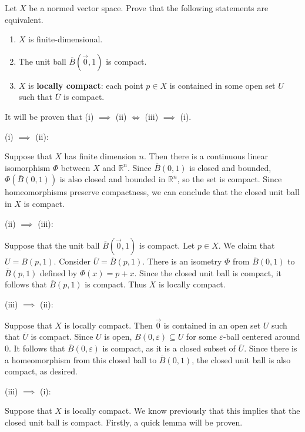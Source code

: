 \documentclass{article}
\newcommand{\cl}[1]{\overline{#1}}
\theoremstyle{plain} %
\numberwithin{thm}{section} %
\theoremstyle{definition}
\begin{document}
    \begin{question}{24}
        Let $X$ be a normed vector space. Prove that the following statements are equivalent.
        \begin{enumerate}[label=(\roman*)]
            \item $X$ is finite-dimensional.
            \item The unit ball $\cl{B}(\vec{0},1)$ is compact.
            \item $X$ is \textbf{locally compact}: each point $p\in X$ is contained in some open set $U$ such that $\cl{U}$ is compact.
        \end{enumerate}
        \tcblower
        It will be proven that (i) \(\implies\) (ii) \(\iff\) (iii) \(\implies\) (i).

        (i) \(\implies\)  (ii):

        Suppose that \(X\) has finite dimension \(n\). Then there is a continuous linear isomorphism \(\Phi\) between \(X\) and \(\mathbb{R}^n\). Since \(\cl{B}(0,1)\) is closed and bounded, \(\Phi (\cl{B}(0,1))\) is also closed and bounded in \(\mathbb{R}^n\), so the set is compact. Since homeomorphisms preserve compactness, we can conclude that the closed unit ball in \(X\) is compact.

        (ii) \(\implies\) (iii):

        Suppose that the unit ball \(\cl{B}(\vec{0}, 1)\) is compact. Let \(p \in X\). We claim that \(U = B(p,1)\). Consider \(\cl{U} = \cl{B}(p,1)\). There is an isometry \(\Phi\) from \(\cl{B}(0,1)\) to \(\cl{B}(p,1)\) defined by \(\Phi (x) = p + x\). Since the closed unit ball is compact, it follows that \(\cl{B}(p,1)\) is compact. Thus \(X\) is locally compact.

        (iii) \(\implies\) (ii):

        Suppose that \(X\) is locally compact. Then \(\vec{0}\) is contained in an open set \(U\) such that \(\cl{U}\) is compact. Since \(U\) is open, \(B(0, \varepsilon) \subseteq U\) for some \(\varepsilon\)-ball centered around 0. It follows that \(\cl{B}(0,\varepsilon)\) is compact, as it is a closed subset of \(\cl{U}\). Since there is a homeomorphism from this closed ball to \(\cl{B}(0,1)\), the closed unit ball is also compact, as desired.

        (iii) \(\implies\) (i):

        Suppose that \(X\) is locally compact. We know previously that this implies that the closed unit ball is compact. Firstly, a quick lemma will be proven.


\end{question}
\end{document}
